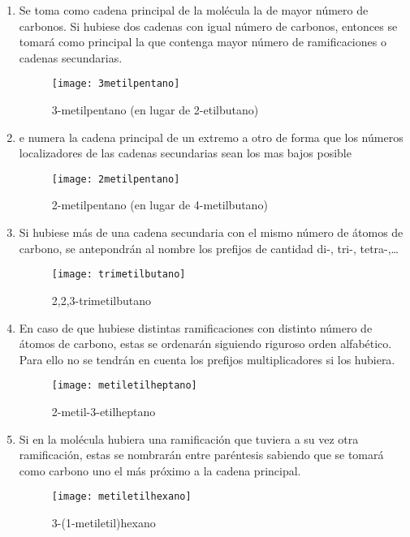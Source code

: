 \begin{enumerate}
	\item Se toma como cadena principal de la molécula la de mayor número de carbonos. Si hubiese dos cadenas con igual número de carbonos, entonces se tomará como principal la que contenga mayor número de ramificaciones o cadenas secundarias.
	\begin{figure}[h!]
		\centering
		\texttt{[image: 3metilpentano]}
		\captionsetup{labelformat=empty}
		\caption{3-metilpentano (en lugar de 2-etilbutano)}
	\end{figure}
	\item e numera la cadena principal de un extremo a otro de forma que los números localizadores de las cadenas secundarias sean los mas bajos posible
	\begin{figure}[h!]
		\centering
		\texttt{[image: 2metilpentano]}
		\captionsetup{labelformat=empty}
		\caption{2-metilpentano (en lugar de 4-metilbutano)}
	\end{figure}
	\item Si hubiese más de una cadena secundaria con el mismo número de átomos de carbono, se antepondrán al nombre los  prefijos de cantidad di-, tri-, tetra-,…
	\begin{figure}[h!]
		\centering
		\texttt{[image: trimetilbutano]}
		\captionsetup{labelformat=empty}
		\caption{2,2,3-trimetilbutano}
	\end{figure}
	\item En caso de que hubiese distintas ramificaciones con distinto número de átomos de carbono, estas se ordenarán siguiendo riguroso orden alfabético. Para ello no se tendrán en cuenta los prefijos multiplicadores si los hubiera.
	\begin{figure}[h!]
		\centering
		\texttt{[image: metiletilheptano]}
		\captionsetup{labelformat=empty}
		\caption{2-metil-3-etilheptano}
	\end{figure}
	\item Si en la molécula hubiera una ramificación que tuviera a su vez otra ramificación, estas se nombrarán entre paréntesis sabiendo que se tomará como carbono uno el más próximo a la cadena principal.
	 \begin{figure}[h!]
	 	\centering
	 	\texttt{[image: metiletilhexano]}
	 	\captionsetup{labelformat=empty}
	 	\caption{3-(1-metiletil)hexano}
	 \end{figure}

\end{enumerate}




